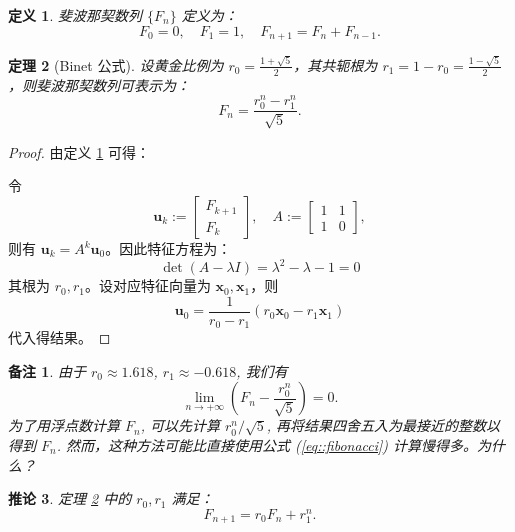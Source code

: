 \documentclass[a4paper]{ctexart}
\newtheorem{theorem}{定理}
\newtheorem{remark}{备注}
\newtheorem{definition}[theorem]{定义} %
\newtheorem{corollary}[theorem]{推论}
\numberwithin{theorem}{section}
\numberwithin{equation}{section}
\numberwithin{figure}{section}
\numberwithin{remark}{section}
\begin{document}
\begin{definition}
    \label{def::fibonacci}
斐波那契数列 \( \{F_n\} \) 定义为：
\begin{equation}
    \label{eq::fibonacci}
F_0 = 0, \quad F_1 = 1, \quad F_{n+1} = F_n + F_{n-1}.
\end{equation}
\end{definition}

\begin{theorem}[Binet 公式]
    \label{thm::binet}
设黄金比例为 \( r_0 = \frac{1+\sqrt{5}}{2} \)，其共轭根为 \( r_1 = 1 - r_0 = \frac{1 - \sqrt{5}}{2} \)，则斐波那契数列可表示为：
\begin{equation}
F_n = \frac{r_0^n - r_1^n}{\sqrt{5}}.
\end{equation}
\end{theorem}

\begin{proof}
由定义 \ref{def::fibonacci} 可得：

令
\[
\mathbf{u}_k := 
\begin{bmatrix}
F_{k+1} \\
F_k
\end{bmatrix},
\quad
A := 
\begin{bmatrix}
1 & 1 \\
1 & 0
\end{bmatrix},
\]
则有 \( \mathbf{u}_k = A^k \mathbf{u}_0 \)。因此特征方程为：
\[
\det(A - \lambda I) = \lambda^2 - \lambda - 1 = 0
\]
其根为 \( r_0, r_1 \)。设对应特征向量为 \( \mathbf{x}_0, \mathbf{x}_1 \)，则
\[
\mathbf{u}_0 = \frac{1}{r_0 - r_1} (r_0 \mathbf{x}_0 - r_1 \mathbf{x}_1)
\]
代入得结果。
\end{proof}

\begin{remark}
由于 \( r_0 \approx 1.618 \), \( r_1 \approx -0.618 \), 我们有
\[
\lim_{n \to +\infty} \left(F_n - \frac{r_0^n}{\sqrt{5}}\right) = 0.
\]
为了用浮点数计算 \( F_n \), 可以先计算 \( r_0^n / \sqrt{5} \), 再将结果四舍五入为最接近的整数以得到 \( F_n \). 
然而，这种方法可能比直接使用公式 (\ref{eq::fibonacci}) 计算慢得多。为什么？
\end{remark}

\begin{corollary}
    \label{cor::fib_recurrence}
定理 \ref{thm::binet} 中的 \( r_0, r_1 \) 满足：
\begin{equation}
F_{n+1} = r_0 F_n + r_1^n.
\end{equation}
\end{corollary}
\end{document}

